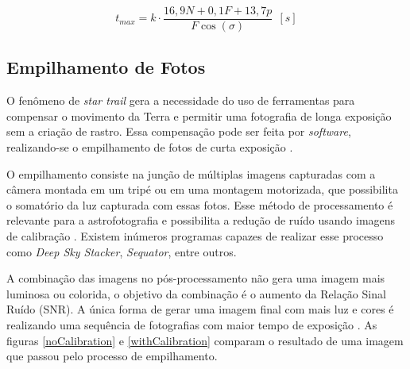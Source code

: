\begin{equation}
	t_{max} = k \cdot \dfrac{16,9 N  + 0,1 F + 13,7 p}{F\cos(\sigma)}~~[s]
	\label{eq:npf}
\end{equation}

\subsection{Empilhamento de Fotos}

O fenômeno de \textit{star trail} gera a necessidade do uso de ferramentas para compensar o movimento da Terra e permitir uma fotografia de longa exposição sem a criação de rastro. Essa compensação pode ser feita por \textit{software}, realizando-se o empilhamento de fotos de curta exposição \cite{livro:astropratica}.

O empilhamento consiste na junção de múltiplas imagens capturadas com a câmera montada em um tripé ou em uma montagem motorizada, que possibilita o somatório da luz capturada com essas fotos. Esse método de processamento é relevante para a astrofotografia e possibilita a redução de ruído usando imagens de calibração \cite{book:bbcsky}. Existem inúmeros programas capazes de realizar esse processo como \textit{Deep Sky Stacker}, \textit{Sequator}, entre outros.

A combinação das imagens no pós-processamento não gera uma imagem mais luminosa ou colorida, o objetivo da combinação é o aumento da Relação Sinal Ruído (SNR). A única forma de gerar uma imagem final com mais luz e cores é realizando uma sequência de fotografias com maior tempo de exposição \cite{man:deepskystackerBetterImages}. As figuras \ref{noCalibration} e \ref{withCalibration} comparam o resultado de uma imagem que passou pelo processo de empilhamento. 

